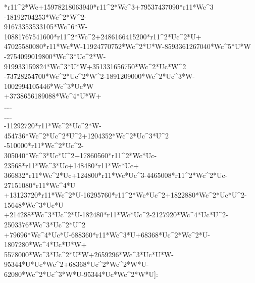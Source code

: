 \documentclass[letterpaper,12pt,titlepage,oneside,final]{book}
\newenvironment{codefont}{\footnotesize\ttfamily}{\par}
\begin{document}
\begin{appendices}
\begin{codefont}
-23927689080*r11\^{}2*Wc+15978218063940*r11\^{}2*Wc\^{}3+79537437090*r11*Wc\^{}3\\
-18192704253*Wc\^{}2*W\^{}2-\\
91673353533105*Wc\^{}6*W-10881767541600*r11\^{}2*Wc\^{}2+2486166415200*r11\^{}2*Uc\^{}2*U+\\
47025580080*r11*Wc*W-11924770752*Wc\^{}2*U*W-8593361267040*Wc\^{}5*U*W\\
-2754099019800*Wc\^{}3*Uc\^{}2*W-919933159824*Wc\^{}3*U*W+351331656750*Wc\^{}2*Uc*W\^{}2\\
-73728254700*Wc\^{}2*Uc\^{}2*W\^{}2-1891209000*Wc\^{}2*Uc\^{}3*W-1002994105446*Wc\^{}3*Uc*W\\
+3738656189088*Wc\^{}4*U*W+\\
....\\
....\\
-11292720*r11*Wc\^{}2*Uc\^{}2*W-454736*Wc\^{}2*Uc\^{}2*U\^{}2+1204352*Wc\^{}2*Uc\^{}3*U\^{}2\\
-510000*r11*Wc\^{}2*Uc\^{}2-\\
305040*Wc\^{}3*Uc*U\^{}2+17860560*r11\^{}2*Wc*Uc-23568*r11*Wc\^{}3*Uc+148480*r11*Wc*Uc+\\
366832*r11*Wc\^{}2*Uc+124800*r11*Wc*Uc\^{}3-4465008*r11\^{}2*Wc\^{}2*Uc-27151080*r11*Wc\^{}4*U\\
+13123720*r11*Wc\^{}2*U-16295760*r11\^{}2*Wc*Uc\^{}2+1822880*Wc\^{}2*Uc*U\^{}2-15648*Wc\^{}3*Uc*U\\
+214288*Wc\^{}3*Uc\^{}2*U-182480*r11*Wc*Uc\^{}2-2127920*Wc\^{}4*Uc*U\^{}2-2503376*Wc\^{}3*Uc\^{}2*U\^{}2\\
+79696*Wc\^{}4*Uc*U-688360*r11*Wc\^{}3*U+68368*Uc\^{}2*Wc\^{}2*U-1807280*Wc\^{}4*Uc*U*W+\\
5578000*Wc\^{}3*Uc\^{}2*U*W+2659296*Wc\^{}3*Uc*U*W-95344*U*Uc*Wc\^{}2+68368*Uc\^{}2*Wc\^{}2*W*U-\\
62080*Wc\^{}2*Uc\^{}3*W*U-95344*Uc*Wc\^{}2*W*U]:\\
\end{codefont}


\end{appendices}
\end{document}

